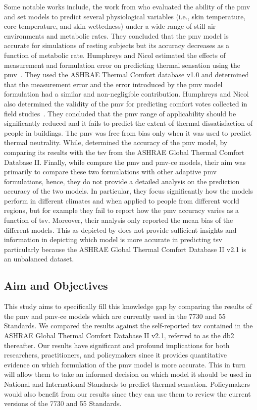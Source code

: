 Some notable works include, the work from  who evaluated the ability of the \ac{pmv} and \ac{set} models to predict several physiological variables (i.e., skin temperature, core temperature, and skin wettedness) under a wide range of still air environments and metabolic rates.
They concluded that the \ac{pmv} model is accurate for simulations of resting subjects but its accuracy decreases as a function of metabolic rate.
Humphreys and Nicol estimated the effects of measurement and formulation error on predicting thermal sensation using the \ac{pmv}~\cite{Humphreys2000}.
They used the ASHRAE Thermal Comfort database v1.0 and determined that the measurement error and the error introduced by the \ac{pmv} model formulation had a similar and non-negligible contribution.
Humphreys and Nicol also determined the validity of the \ac{pmv} for predicting comfort votes collected in field studies~\cite{Humphreys2002}.
They concluded that the \ac{pmv} range of applicability should be significantly reduced and it fails to predict the extent of thermal dissatisfaction of people in buildings.
The \ac{pmv} was free from bias only when it was used to predict thermal neutrality.
While,  determined the accuracy of the \ac{pmv} model, by comparing its results with the \ac{tsv} from the ASHRAE Global Thermal Comfort Database II.
Finally, while  compare the \ac{pmv} and \ac{pmv-ce} models, their aim was primarily to compare these two formulations with other adaptive \ac{pmv} formulations, hence, they do not provide a detailed analysis on the prediction accuracy of the two models.
In particular, they focus significantly how the models perform in different climates and when applied to people from different world regions, but for example they fail to report how the \ac{pmv} accuracy varies as a function of \ac{tsv}.
Moreover, their analysis only reported the mean bias of the different models.
This as depicted by  does not provide sufficient insights and information in depicting which model is more accurate in predicting \ac{tsv} particularly because the ASHRAE Global Thermal Comfort Database II v2.1 is an unbalanced dataset.

\subsection{Aim and Objectives}\label{subsec:aim-and-objectives}
This study aims to specifically fill this knowledge gap by comparing the results of the \ac{pmv} and \ac{pmv-ce} models which are currently used in the \gls{7730} and \gls{55} Standards.
We compared the results against the self-reported \ac{tsv} contained in the ASHRAE Global Thermal Comfort Database II v2.1, referred to as the \gls{db2} thereafter.
Our results have significant and profound implications for both researchers, practitioners, and policymakers since it provides quantitative evidence on which formulation of the \ac{pmv} model is more accurate.
This in turn will allow them to take an informed decision on which model it should be used in National and International Standards to predict thermal sensation.
Policymakers would also benefit from our results since they can use them to review the current versions of the \gls{7730} and \gls{55} Standards.